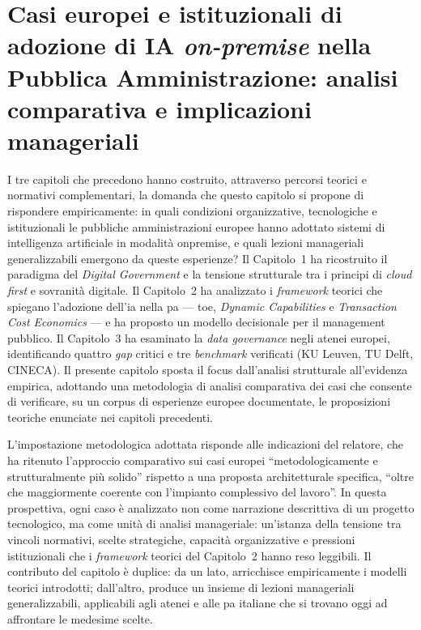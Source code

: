 \chapter{Casi europei e istituzionali di adozione di IA \textit{on-premise} nella
Pubblica Amministrazione: analisi comparativa e implicazioni manageriali}
\label{chap:casi-europei}

I tre capitoli che precedono hanno costruito, attraverso percorsi teorici e normativi
complementari, la domanda che questo capitolo si propone di rispondere empiricamente:
in quali condizioni organizzative, tecnologiche e istituzionali le pubbliche
amministrazioni europee hanno adottato sistemi di intelligenza artificiale in
modalità \gls{onpremise}, e quali lezioni manageriali generalizzabili emergono
da queste esperienze? Il Capitolo~1 ha ricostruito il paradigma del \textit{Digital
Government} e la tensione strutturale tra i principi di \textit{cloud first} e
sovranità digitale. Il Capitolo~2 ha analizzato i \textit{framework} teorici che
spiegano l'adozione dell'\gls{ia} nella \gls{pa} --- \gls{toe}, \textit{Dynamic Capabilities} e
\textit{Transaction Cost Economics} --- e ha proposto un modello decisionale per
il management pubblico. Il Capitolo~3 ha esaminato la \textit{data governance}
negli atenei europei, identificando quattro \textit{gap} critici e tre
\textit{benchmark} verificati (KU Leuven, TU Delft, CINECA). Il presente capitolo
sposta il focus dall'analisi strutturale all'evidenza empirica, adottando una
metodologia di analisi comparativa dei casi che consente di verificare, su un corpus
di esperienze europee documentate, le proposizioni teoriche enunciate nei capitoli
precedenti.

L'impostazione metodologica adottata risponde alle indicazioni del relatore, che ha
ritenuto l'approccio comparativo sui casi europei ``metodologicamente e strutturalmente
più solido'' rispetto a una proposta architetturale specifica, ``oltre che maggiormente
coerente con l'impianto complessivo del lavoro''. In questa prospettiva, ogni caso
è analizzato non come narrazione descrittiva di un progetto tecnologico, ma come
unità di analisi manageriale: un'istanza della tensione tra vincoli
normativi, scelte strategiche, capacità organizzative e pressioni istituzionali che
i \textit{framework} teorici del Capitolo~2 hanno reso leggibili. Il contributo
del capitolo è duplice: da un lato, arricchisce empiricamente i modelli teorici
introdotti; dall'altro, produce un insieme di lezioni manageriali generalizzabili,
applicabili agli atenei e alle \gls{pa} italiane che si trovano oggi ad affrontare le
medesime scelte.

